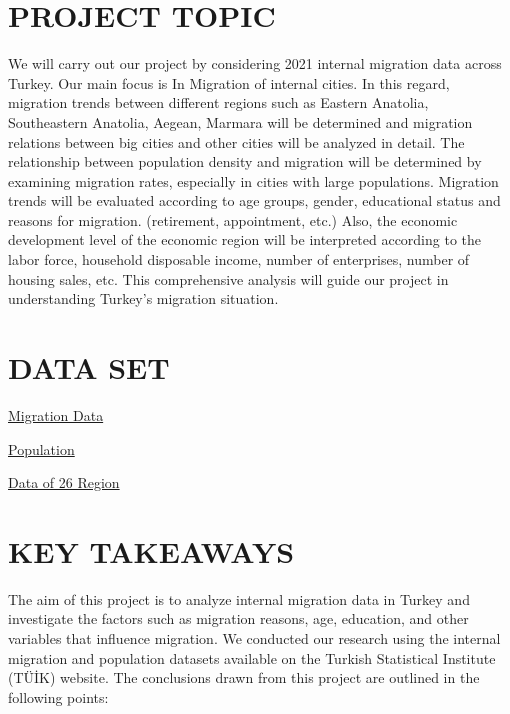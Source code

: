 \documentclass[
  11pt,
  a4paper,
  DIV=11,
  numbers=noendperiod]{scrartcl}
\begin{document}
\hypertarget{project-topic}{%
\section{PROJECT TOPIC}\label{project-topic}}

We will carry out our project by considering 2021 internal migration
data across Turkey. Our main focus is In Migration of internal cities.
In this regard, migration trends between different regions such as
Eastern Anatolia, Southeastern Anatolia, Aegean, Marmara will be
determined and migration relations between big cities and other cities
will be analyzed in detail. The relationship between population density
and migration will be determined by examining migration rates,
especially in cities with large populations. Migration trends will be
evaluated according to age groups, gender, educational status and
reasons for migration. (retirement, appointment, etc.) Also, the
economic development level of the economic region will be interpreted
according to the labor force, household disposable income, number of
enterprises, number of housing sales, etc. This comprehensive analysis
will guide our project in understanding Turkey's migration situation.

\hypertarget{data-set}{%
\section{DATA SET}\label{data-set}}

\href{https://github.com/emu-hacettepe-analytics/emu430-fall2023-team-data_vizards/raw/master/Dataframe/migration_data.RData}{Migration
Data}

\href{https://github.com/emu-hacettepe-analytics/emu430-fall2023-team-data_vizards/raw/master/Dataframe/population_data.RData}{Population}

\href{https://github.com/emu-hacettepe-analytics/emu430-fall2023-team-data_vizards/raw/master/Dataframe/region26_data.RData}{Data
of 26 Region}

\hypertarget{key-takeaways}{%
\section{KEY TAKEAWAYS}\label{key-takeaways}}

The aim of this project is to analyze internal migration data in Turkey
and investigate the factors such as migration reasons, age, education,
and other variables that influence migration. We conducted our research
using the internal migration and population datasets available on the
Turkish Statistical Institute (TÜİK) website. The conclusions drawn from
this project are outlined in the following points:
\end{document}
